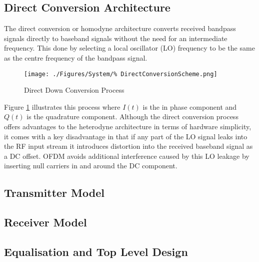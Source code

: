 \subsection{Direct Conversion Architecture}
The direct conversion or homodyne architecture converts received %
bandpass signals directly to baseband signals without the need for an %
intermediate frequency. This done by selecting a local oscillator (LO) %
frequency to be the same as the centre frequency of the bandpass %
signal.
\begin{figure}[ht]
	\centering
	\texttt{[image: ./Figures/System/\%
	DirectConversionScheme.png]}
	\caption{Direct Down Conversion Process}
	\label{fig:DDC}
\end{figure}
Figure \ref{fig:DDC} illustrates this process where $I(t)$ is the %
in phase component and $Q(t)$ is the quadrature component. %
Although the direct conversion process offers advantages to the %
heterodyne architecture in terms of hardware simplicity, it comes %
with a key disadvantage in that if any part of the LO signal %
leaks into the RF input stream it introduces distortion into the %
received baseband signal as a DC offset. OFDM avoids %
additional interference caused by this LO leakage by inserting %
null carriers in and around the DC component.

\subsection{Transmitter Model}


\subsection{Receiver Model}


\subsection{Equalisation and Top Level Design}
